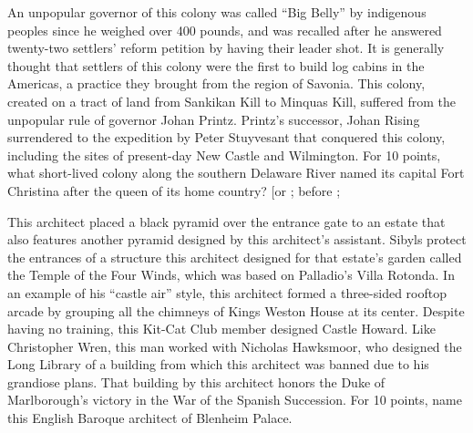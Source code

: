 \documentclass[10pt]{article}
\begin{document}
\begin{tossup}
An unpopular governor of this colony was called “Big Belly” by indigenous peoples since he weighed over 400
pounds, and was recalled after he answered twenty-two settlers’ reform petition by having their leader shot. It is
generally thought that settlers of this colony were the first to build log cabins in the Americas, a practice they
brought from the region of Savonia. This colony, created on a tract of land from Sankikan Kill to Minquas Kill,
suffered from the unpopular rule of governor Johan Printz. Printz’s successor, Johan Rising 
surrendered to the expedition by Peter Stuyvesant  that conquered this colony, including the sites
of present-day New Castle and Wilmington. For 10 points, what short-lived colony along the southern Delaware
River named its capital Fort Christina after the queen of its home country?
[or  ;
 before ;
\end{tossup}


\begin{tossup}
This architect placed a black pyramid over the entrance gate to an estate that also features another pyramid
designed by this architect’s assistant. Sibyls protect the entrances of a structure this architect designed for that
estate’s garden called the Temple of the Four Winds, which was based on Palladio’s Villa Rotonda. In an example
of his “castle air” style, this architect formed a three-sided rooftop arcade by grouping all the chimneys of Kings
Weston House at its center. Despite having no training, this Kit-Cat Club member designed Castle Howard. Like
Christopher Wren, this man worked with Nicholas Hawksmoor, who designed the Long Library of a building from
which this architect was banned due to his grandiose plans. That building by this architect honors the Duke of
Marlborough’s victory in the War of the Spanish Succession. For 10 points, name this English Baroque architect of
Blenheim Palace.
\end{tossup}
\end{document}
